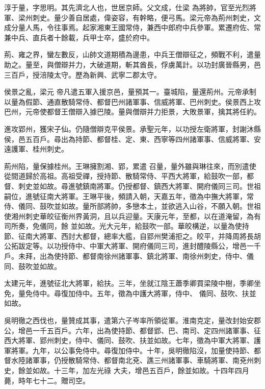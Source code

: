 \begin{pinyinscope}
 淳于量，字思明。其先濟北人也，世居京師。父文成，仕梁
 為將帥，官至光烈將軍、梁州刺史。量少善自居處，偉姿容，有幹略，便弓馬。梁元帝為荊州刺史，文成分量人馬，令往事焉。起家湘東王國常侍，兼西中郎府中兵參軍。累遷府佐、常兼中兵、直兵者十餘載，兵甲士卒，盛於府中。



 荊、雍之界，蠻左數反，山帥文道期積為邊患，中兵王僧辯征之，頻戰不利，遣量助之。量至，與僧辯并力，大破道期，斬其酋長，俘虜萬計。以功封廣晉縣男，邑三百戶，授涪陵太守。歷為新興、武寧二郡太守。



 侯景之亂，梁元
 帝凡遣五軍入援京邑，量預其一。臺城陷，量還荊州。元帝承制以量為假節、通直散騎常侍、都督巴州諸軍事、信威將軍、巴州刺史。侯景西上攻巴州，元帝使都督王僧辯入據巴陵。量與僧辯并力拒景，大敗景軍，擒其將任約。



 進攻郢州，獲宋子仙。仍隨僧辯克平侯景。承聖元年，以功授左衛將軍，封謝沐縣侯，邑五百戶。尋出為持節、都督桂、定、東、西寧等四州諸軍事、信威將軍、安遠護軍、桂州刺史。



 荊州陷，量保據桂州。王琳擁割湘、郢，累遣
 召量，量外雖與琳往來，而別遣使從間道歸於高祖。高祖受禪，授持節、散騎常侍、平西大將軍，給鼓吹一部，都督、刺史並如故。尋進號鎮南將軍。仍授都督、鎮西大將軍、開府儀同三司。世祖嗣位，進號征南大將軍。王琳平後，頻請入朝，天嘉五年，徵為中撫大將軍，常侍、儀同、鼓吹並如故。量所部將帥，多戀本土，並欲逃入山谷，不願入朝。世祖使湘州刺史華皎征衡州界黃洞，且以兵迎量。天康元年，至都，以在道淹留，為有司所奏，免儀同，餘
 並如故。光大元年，給鼓吹一部。華皎構逆，以量為使持節、征南大將軍、西討大都督，總率大艦，自郢州樊浦拒之。皎平，并降周將長胡公拓跋定等。以功授侍中、中軍大將軍、開府儀同三司，進封醴陵縣公，增邑一千戶。未拜，出為使持節、都督南徐州諸軍事、鎮北將軍、南徐州刺史，侍中、儀同、鼓吹並如故。



 太建元年，進號征北大將軍，給扶。三年，坐就江陰王蕭季卿買梁陵中樹，季卿坐免，量免侍中。尋復加侍中。五年，徵為中護大將軍，侍中、
 儀同、鼓吹、扶並如故。



 吳明徹之西伐也，量贊成其事，遣第六子岑率所領從軍。淮南克定，量改封始安郡公，增邑一千五百戶。六年，出為使持節、都督郢、巴、南司、定四州諸軍事、征西大將軍、郢州刺史，侍中、儀同、鼓吹、扶並如故。七年，徵為中軍大將軍、護軍將軍。九年，以公事免侍中。尋復加侍中。十年，吳明徹陷沒，加量使持節、都督水陸諸軍事，仍授散騎常侍、都督南北兗、譙三州諸軍事、車騎將軍、南兗州刺史，餘並如故。十三年，加左光祿
 大夫，增邑五百戶，餘並如故。十四年四月薨，時年七十二。贈司空。




\end{pinyinscope}
